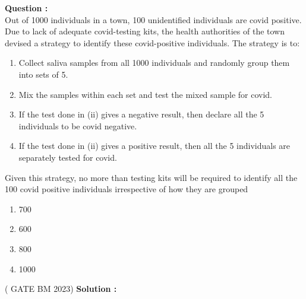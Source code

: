 \documentclass[journal,12pt,onecolumn]{IEEEtran}
\renewcommand{\thefigure}{\theenumi}
\renewcommand{\thetable}{\theenumi}
\begin{document}

\bigskip

\renewcommand{\thefigure}{\arabic{figure}}
\renewcommand{\thetable}{\theenumi}

%

\textbf{Question :}\\
Out of 1000 individuals in a town, 100 unidentified individuals are covid positive.
Due to lack of adequate covid-testing kits, the health authorities of the town devised
a strategy to identify these covid-positive individuals. The strategy is to:
\begin{enumerate}
\item Collect saliva samples from all 1000 individuals and randomly group
them into sets of 5.
\item Mix the samples within each set and test the mixed sample for covid.
\item If the test done in (ii) gives a negative result, then declare all the 5
individuals to be covid negative.
\item If the test done in (ii) gives a positive result, then all the 5 individuals
are separately tested for covid.
\end{enumerate}
Given this strategy, no more than testing kits will be required to identify
all the 100 covid positive individuals irrespective of how they are grouped \\ 
\begin{enumerate}
\item 700
\item 600
\item 800
\item 1000
\end{enumerate}\hfill ( GATE BM 2023)
\fi
\textbf{Solution :}
\end{document}
